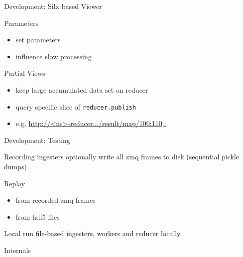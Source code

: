 \documentclass[aspectratio=169]{beamer}
\begin{document}
\begin{frame}{Development: Silx based Viewer}
 \begin{block}{Parameters}
 \begin{itemize}
  \item set parameters
  \item influence slow processing
 \end{itemize}
 \end{block}

 \begin{block}{Partial Views}
  \begin{itemize}
   \item keep large accumulated data set on reducer
   \item query specific slice of \texttt{reducer.publish}
   \item e.g. \url{http://<ns>-reducer.../result/map/100:110,:}
  \end{itemize}
 \end{block}


\end{frame}


\begin{frame}{Development: Testing}
 \begin{block}{Recording}
  ingesters optionally write all zmq frames to disk (sequential pickle dumps)
 \end{block}
    
\begin{block}{Replay}
\begin{itemize}
 \item from recorded zmq frames
 \item from hdf5 files
\end{itemize}
\end{block}

\begin{block}{Local}
 run file-based ingesters, workers and reducer locally
\end{block}

\end{frame}

\begin{frame}
 \centering
 \Huge {} Internals
\end{frame}
\end{document}
